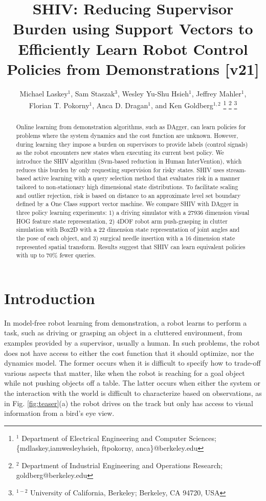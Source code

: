 \documentclass[10pt, conference]{ieeeconf}      %
\title{SHIV: Reducing Supervisor Burden using Support Vectors to Efficiently Learn Robot Control Policies from Demonstrations [v21]}
\author{Michael Laskey$^1$, Sam Staszak$^3$, Wesley Yu-Shu Hsieh$^1$, Jeffrey Mahler$^1$, \\ Florian T. Pokorny$^1$, Anca D. Dragan$^1$, and Ken Goldberg$^{1,2}$%
\thanks{$^1$ Department of Electrical Engineering and Computer Sciences; {\small \{mdlaskey,iamwesleyhsieh, ftpokorny, anca\}@berkeley.edu}}%
\thanks{$^2$ Department of Industrial Engineering and Operations Research; {\small goldberg@berkeley.edu}}%
\thanks{$^{1-2}$ University of California, Berkeley;  Berkeley, CA 94720, USA}%
}
\begin{document}
\maketitle
\thispagestyle{empty}
\pagestyle{empty}



\begin{abstract}
Online learning from demonstration algorithms, such as DAgger, can learn policies for problems where the system
dynamics and the cost function are unknown. However, during learning they impose a burden on supervisors to provide labels (control
signals) as the robot encounters new states when executing its current best policy. We introduce the SHIV
algorithm (Svm-based reduction in Human InterVention), which reduces this burden by only requesting supervision for risky states. SHIV uses stream-based active learning with a query selection method that evaluates risk in a manner tailored to non-stationary high dimensional state distributions.  To facilitate scaling and outlier rejection, risk is based on distance to an approximate level set boundary defined by a One Class support vector machine.  We compare SHIV with DAgger in three policy learning experiments: 1) a driving simulator with a 27936 dimension visual HOG feature state representation, 2) 4DOF robot arm push-grasping in clutter simulation with Box2D with a 22 dimension state representation  of joint angles and the pose of each object, and 3) surgical needle insertion with a 16 dimension state represented spatial transform.  Results suggest that SHIV can learn equivalent policies with up to $70\%$ fewer queries.

 \end{abstract}



\section{Introduction} 


In model-free robot learning from demonstration, a robot learns to perform a task, such as driving or grasping an object in a cluttered environment, from examples provided by a  supervisor, usually a human.  In such problems, the robot does not have access to either the cost function that it should optimize, nor the dynamics model. The former occurs when it is difficult to specify how to trade-off various aspects that matter, like when the robot is reaching for a goal object while not pushing objects off a table.  The latter occurs when either the system or the interaction with the world is difficult to characterize based on observations, as in Fig. \ref{fig:teaser}(a) the robot drives on the track but only has access to visual information from a bird's eye view. 
\end{document}
